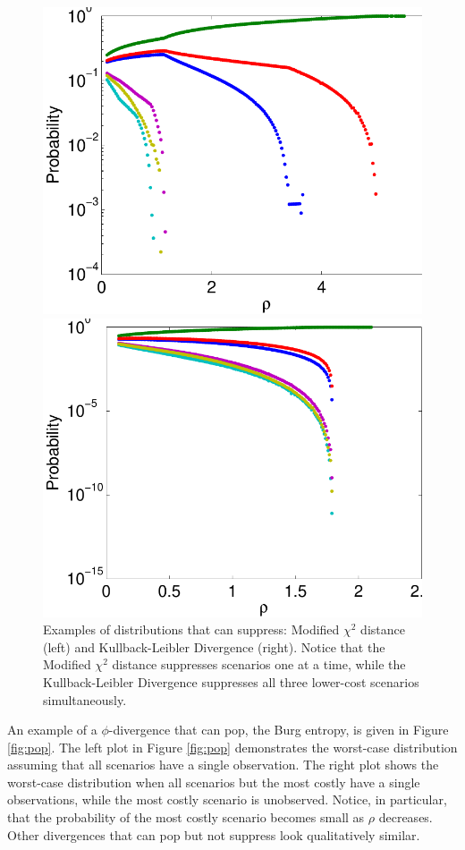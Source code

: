 \documentclass[ijoc,nonblindrev]{informs3} %
\begin{document}
\begin{figure}
	\FIGURE
	{%
		\includegraphics*[width=.5\textwidth]{images/mchi2}%
		\includegraphics*[width=.5\textwidth]{images/kl}%
	}
	{
		Examples of distributions that can suppress: Modified $\chi^2$ distance (left) and Kullback-Leibler Divergence (right).
		Notice that the Modified $\chi^2$ distance suppresses scenarios one at a time, while the Kullback-Leibler Divergence suppresses all three lower-cost scenarios simultaneously.
		\label{fig:suppress}
	}
	{}
\end{figure}

An example of a $\phi$-divergence that can pop, the Burg entropy, is given in Figure \ref{fig:pop}.
The left plot in Figure \ref{fig:pop} demonstrates the worst-case distribution assuming that all scenarios have a single observation.
The right plot shows the worst-case distribution when all scenarios but the most costly have a single observations, while the most costly scenario is unobserved.
Notice, in particular, that the probability of the most costly scenario becomes small as $\rho$ decreases.
Other divergences that can pop but not suppress look qualitatively similar.
\end{document}
